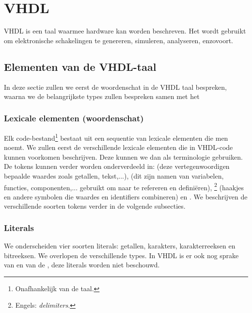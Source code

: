 \chapter{VHDL}
\begin{chapterintro}
VHDL is een taal waarmee hardware kan worden beschreven. Het wordt gebruikt om elektronische schakelingen te genereren, simuleren, analyseren, enzovoort.
\end{chapterintro}
\minitoc[n]
\section{Elementen van de VHDL-taal}
In deze sectie zullen we eerst de woordenschat in de VHDL taal bespreken, waarna we de belangrijkste types zullen bespreken samen met het 
\subsection{Lexicale elementen (woordenschat)}
Elk code-bestand\footnote{Onafhankelijk van de taal.} bestaat uit een sequentie van lexicale elementen die men  noemt. We zullen eerst de verschillende lexicale elementen die in VHDL-code kunnen voorkomen beschrijven. Deze kunnen we dan als terminologie gebruiken. De tokens kunnen verder worden onderverdeeld in:  (deze vertegenwoordigen bepaalde waardes zoals getallen, tekst,...),  (dit zijn namen van variabelen, functies, componenten,... gebruikt om naar te refereren en defini\"eren), \footnote{Engels: \emph{delimiters}.} (haakjes en andere symbolen die waardes en identifiers combineren) en . We beschrijven de verschillende soorten tokens verder in de volgende subsecties.

\subsection{Literals}
We onderscheiden vier soorten literals: getallen, karakters, karakterreeksen en bitreeksen. We overlopen de verschillende types. In VHDL is er ook nog sprake van  en van de , deze literals worden niet beschouwd.

